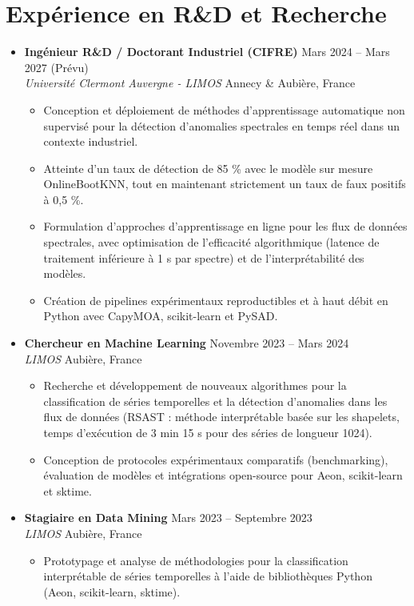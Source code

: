 \documentclass[12pt,a4paper]{article}
\begin{document}
\section*{Expérience en R\&D et Recherche}
\begin{itemize}
\item \textbf{Ingénieur R\&D / Doctorant Industriel (CIFRE)} \hfill Mars 2024 -- Mars 2027 (Prévu)\\
\textit{Université Clermont Auvergne - LIMOS} \hfill Annecy \& Aubière, France
\begin{itemize}
\item Conception et déploiement de méthodes d'apprentissage automatique non supervisé pour la détection d'anomalies spectrales en temps réel dans un contexte industriel.
\item Atteinte d'un taux de détection de 85 \% avec le modèle sur mesure OnlineBootKNN, tout en maintenant strictement un taux de faux positifs à 0,5 \%.
\item Formulation d'approches d'apprentissage en ligne pour les flux de données spectrales, avec optimisation de l'efficacité algorithmique (latence de traitement inférieure à 1 s par spectre) et de l'interprétabilité des modèles.
\item Création de pipelines expérimentaux reproductibles et à haut débit en Python avec CapyMOA, scikit-learn et PySAD.
\end{itemize}

\item \textbf{Chercheur en Machine Learning} \hfill Novembre 2023 -- Mars 2024\\
\textit{LIMOS} \hfill Aubière, France
\begin{itemize}
\item Recherche et développement de nouveaux algorithmes pour la classification de séries temporelles et la détection d'anomalies dans les flux de données (RSAST : méthode interprétable basée sur les shapelets, temps d'exécution de 3 min 15 s pour des séries de longueur 1024).
\item Conception de protocoles expérimentaux comparatifs (benchmarking), évaluation de modèles et intégrations open-source pour Aeon, scikit-learn et sktime.
\end{itemize}

\item \textbf{Stagiaire en Data Mining} \hfill Mars 2023 -- Septembre 2023\\
\textit{LIMOS} \hfill Aubière, France
\begin{itemize}
\item Prototypage et analyse de méthodologies pour la classification interprétable de séries temporelles à l'aide de bibliothèques Python (Aeon, scikit-learn, sktime).
\end{itemize}
\end{itemize}
\end{document}
